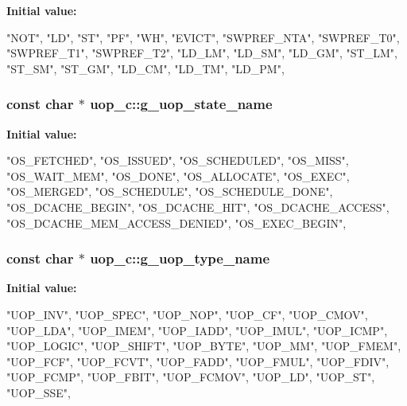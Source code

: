 {\bfseries Initial value:}
\begin{DoxyCode}
 {
  "NOT",
  "LD",
  "ST",
  "PF",
  "WH",
  "EVICT",
  "SWPREF_NTA",
  "SWPREF_T0",
  "SWPREF_T1",
  "SWPREF_T2",
  "LD_LM",
  "LD_SM",
  "LD_GM",
  "ST_LM",
  "ST_SM",
  "ST_GM",
  "LD_CM",
  "LD_TM",
  "LD_PM",
}
\end{DoxyCode}
\hypertarget{classuop__c_ab3f606b096f11a3f1c14f4efa38551ff}{
\subsubsection[{g\_\-uop\_\-state\_\-name}]{\setlength{\rightskip}{0pt plus 5cm}const char $\ast$ uop\_\-c::g\_\-uop\_\-state\_\-name}}
\label{classuop__c_ab3f606b096f11a3f1c14f4efa38551ff}
{\bfseries Initial value:}
\begin{DoxyCode}
 {
  "OS_FETCHED",
  "OS_ISSUED",
  "OS_SCHEDULED",
  "OS_MISS",
  "OS_WAIT_MEM",
  "OS_DONE",
  "OS_ALLOCATE",
  "OS_EXEC",
  "OS_MERGED",
  "OS_SCHEDULE",
  "OS_SCHEDULE_DONE",
  "OS_DCACHE_BEGIN",
  "OS_DCACHE_HIT",
  "OS_DCACHE_ACCESS",
  "OS_DCACHE_MEM_ACCESS_DENIED",
  "OS_EXEC_BEGIN",
}
\end{DoxyCode}
\hypertarget{classuop__c_a2c6dcc9d7bc69d525430cb9f1f3d481c}{
\subsubsection[{g\_\-uop\_\-type\_\-name}]{\setlength{\rightskip}{0pt plus 5cm}const char $\ast$ uop\_\-c::g\_\-uop\_\-type\_\-name}}
\label{classuop__c_a2c6dcc9d7bc69d525430cb9f1f3d481c}
{\bfseries Initial value:}
\begin{DoxyCode}
 {
  "UOP_INV",
  "UOP_SPEC",
  "UOP_NOP",
  "UOP_CF",
  "UOP_CMOV",
  "UOP_LDA",
  "UOP_IMEM",
  "UOP_IADD",
  "UOP_IMUL",
  "UOP_ICMP",
  "UOP_LOGIC",
  "UOP_SHIFT",
  "UOP_BYTE",
  "UOP_MM",
  "UOP_FMEM",
  "UOP_FCF",
  "UOP_FCVT",
  "UOP_FADD",
  "UOP_FMUL",
  "UOP_FDIV",
  "UOP_FCMP",
  "UOP_FBIT",
  "UOP_FCMOV",
  "UOP_LD",
  "UOP_ST",
  "UOP_SSE",
}
\end{DoxyCode}
